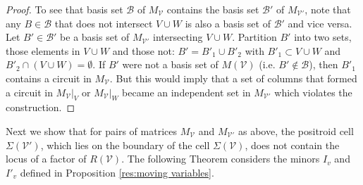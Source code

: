 \documentclass[11pt]{article}
\newcommand{\cV}{\mathcal{V}}
\newcommand{\cB}{\mathcal{B}}
\newcommand{\Rows}{\textrm{Row}}
\theoremstyle{remark}
\theoremstyle{definition}
\begin{document}
\begin{proof}
\begin{comment}
\emph{Proof of claim:}Suppose, for contractiction, $I_j = I'_j$. Write $I_j = v_1 \ldots v_k$ with $v_i <_j v_{i+1}$. By definition fo the Grassmann necklace, $a$ is the first column in the $>_j$ ordering of the columns of $C$ that is not contained in the flat defined by previous elements of $I_j$: $\textrm{cl}(\{v_i | v_i <_j a \})$ in $M(C)$. In $C'$, the non-zero entries in the column $a$ lie in the rows where $V$ has non-zero entries: $\Rows(a) \subset \Rows(V)$. Since $a \in I'_j$, the flat $V \cup W$ in $M(C')$ is not contained in the the flat defined by the previous elements of $I'_j$: $V \cup W \not \subset \textrm{cl}(\{v_i | v_i <_j a )$ in $M(C')$. Since $\Rows(V \cup W)$ in $C'$ is the same as $\Rows(V)$ in $C$, the flat defined by $V$ in $M(C)$ is is not contained in the the flat defined by the previous elements of $I_j$: $V\not \subset \textrm{cl}(\{v_i | v_i <_j a ) \}$ in $M(C)$. \todo{is $U$ uniquely defined?} Let $U \subset I_j$ be the smallest subset of $I_j$ that is needed to ensure that $V \subset \textrm{cl}(\{v_i | v_i <_j a \} \cup U)$ in $M(C)$. Note that $a$ preceeds all elements of $U$, by construction s $a \leq_j u$ for all $u \in U$ in $M(C)$. However, also by construction, $a \in U$ in $M(C')$. Therefore, there must be some $b \in U$ that is in $M(C)$ but not in $M(C')$, thus violating $I_j = I'_j$.
\end{comment} 

To see that basis set $\cB$ of $M_\cV$ contains the basis set $\cB'$ of $M_{\cV'}$, note that any $B \in \cB$ that does not intersect $V \cup W$ is also a basis set of $\cB'$ and vice versa. Let $B' \in \cB'$ be a basis set of $M_{\cV'}$ intersecting $V\cup W$. Partition $B'$ into two sets, those elements in $V \cup W$  and those not: $B' = B'_1 \cup B'_2$ with $B'_1 \subset V \cup W$ and $B'_2 \cap (V \cup W) = \emptyset$. If $B'$ were not a basis set of $M(\cV)$ (i.e. $B' \not \in \cB$), then $B'_1$ contains a circuit in $M_\cV$. But this would imply that a set of columns that formed a circuit in $M_{\cV}|_V$ or $M_\cV|_W$ became an independent set in $M_{\cV'}$ which violates the construction.
\end{proof}

Next we show that for pairs of matrices $M_{\cV}$ and $M_{\cV'}$ as above, the positroid cell $\Sigma(\cV')$, which lies on the boundary of the cell $\Sigma(\cV)$, does not contain the locus of a factor of $R(\cV)$. The following Theorem considers the minors $I_v$ and $I'_v$ defined in Proposition \ref{res:moving variables}. 
\end{document}
